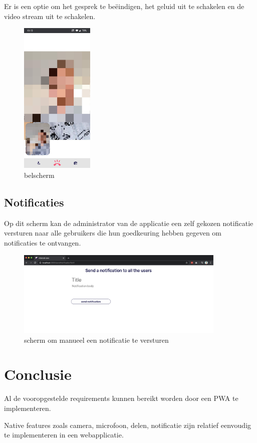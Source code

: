 		Er is een optie om het gesprek te beëindigen, het geluid uit te schakelen en de video stream uit te schakelen.
		\begin{figure}[H]
			\centering
			\includegraphics[width=35mm]{./img/POC/call.jpg}{}		
			\caption{belscherm}
		\end{figure}
		
	\subsection{Notificaties}
		Op dit scherm kan de administrator van de applicatie een zelf gekozen notificatie versturen naar alle gebruikers die hun goedkeuring hebben gegeven om notificaties te ontvangen.
		
		\begin{figure}[H]
			\centering
			\includegraphics[width=100mm]{./img/POC/sendNoti}{}		
			\caption{scherm om manueel een notificatie te versturen}
		\end{figure}
		

\section{Conclusie}
	
	Al de vooropgestelde requirements kunnen bereikt worden door een PWA te implementeren. 
	
	Native features zoals camera, microfoon, delen, notificatie zijn relatief eenvoudig te implementeren in een webapplicatie.
	
